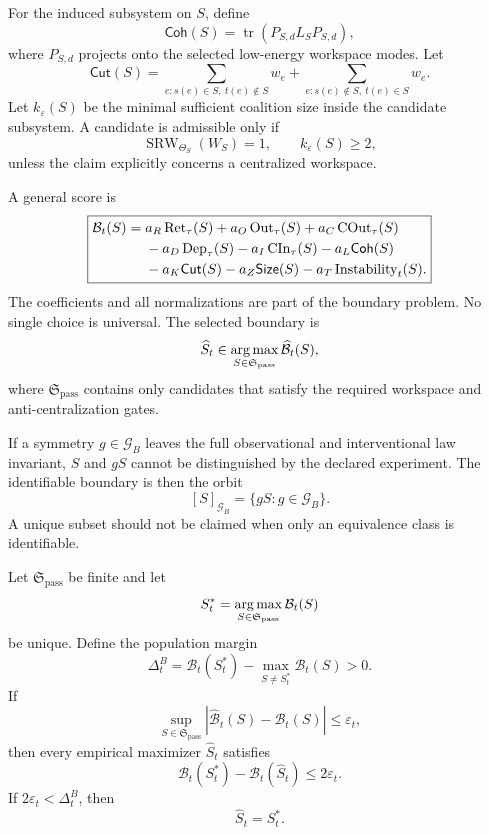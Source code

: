 
For the induced subsystem on \(S\), define
\[
\mathsf{Coh}(S)
=
\operatorname{tr}
\left(
P_{S,d}L_SP_{S,d}
\right),
\]
where \(P_{S,d}\) projects onto the selected low-energy workspace modes. Let
\[
\mathsf{Cut}(S)
=
\sum_{e:s(e)\in S,\ t(e)\notin S}w_e
+
\sum_{e:s(e)\notin S,\ t(e)\in S}w_e.
\]
Let \(k_\varepsilon(S)\) be the minimal sufficient coalition size inside the
candidate subsystem. A candidate is admissible only if
\[
\operatorname{SRW}_{\Theta_S}(W_S)=1,
\qquad
k_\varepsilon(S)\geq2,
\]
unless the claim explicitly concerns a centralized workspace.


A general score is
\[
\boxed{
\begin{aligned}
\mathcal B_t(S)
={}&
 a_R\operatorname{Ret}_\tau(S)
+a_O\operatorname{Out}_\tau(S)
+a_C\operatorname{COut}_\tau(S)\\
&-a_D\operatorname{Dep}_\tau(S)
-a_I\operatorname{CIn}_\tau(S)
-a_L\mathsf{Coh}(S)\\
&-a_K\mathsf{Cut}(S)
-a_Z\mathsf{Size}(S)
-a_T\operatorname{Instability}_t(S).
\end{aligned}
}
\]
The coefficients and all normalizations are part of the boundary problem. No
single choice is universal. The selected boundary is
\[
\widehat S_t
\in
\operatorname*{arg\,max}_{S\in\mathfrak S_{\mathrm{pass}}}
\widehat{\mathcal B}_t(S),
\]
where \(\mathfrak S_{\mathrm{pass}}\) contains only candidates that satisfy the
required workspace and anti-centralization gates.


If a symmetry \(g\in\mathcal G_B\) leaves the full observational and
interventional law invariant, \(S\) and \(gS\) cannot be distinguished by the
declared experiment. The identifiable boundary is then the orbit
\[
[S]_{\mathcal G_B}
=
\{gS:g\in\mathcal G_B\}.
\]
A unique subset should not be claimed when only an equivalence class is
identifiable.


\begin{theorem}\label{thm:heldout-boundary-recovery}
Let \(\mathfrak S_{\mathrm{pass}}\) be finite and let
\[
S_t^*
=
\operatorname*{arg\,max}_{S\in\mathfrak S_{\mathrm{pass}}}
\mathcal B_t(S)
\]
be unique. Define the population margin
\[
\Delta_t^B
=
\mathcal B_t(S_t^*)
-
\max_{S\neq S_t^*}\mathcal B_t(S)>0.
\]
If
\[
\sup_{S\in\mathfrak S_{\mathrm{pass}}}
\left|
\widehat{\mathcal B}_t(S)-\mathcal B_t(S)
\right|
\leq\varepsilon_t,
\]
then every empirical maximizer \(\widehat S_t\) satisfies
\[
\boxed{
\mathcal B_t(S_t^*)-
\mathcal B_t(\widehat S_t)
\leq2\varepsilon_t.
}
\]
If \(2\varepsilon_t<\Delta_t^B\), then
\[
\boxed{\widehat S_t=S_t^*.}
\]
\end{theorem}

